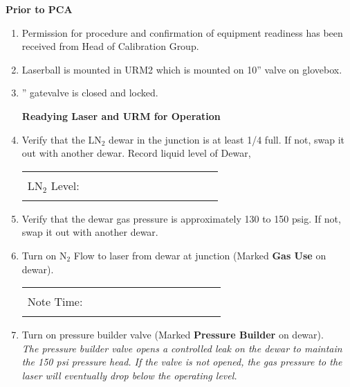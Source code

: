 \begin{center}
                     {\bf Prior to PCA}
\end{center}
\begin{enumerate}
\item\checkbox Permission for procedure and confirmation of equipment readiness
  has been received from Head of Calibration Group.

\item\checkbox Laserball is mounted in URM2 which is
  mounted on 10'' valve on glovebox.

\item{}'' gatevalve is closed and locked.

  

\begin{center}
                  {\bf Readying Laser and URM for Operation}
\end{center}

\item\checkbox Verify that the LN$_2$ dewar in the junction is
  at least 1/4 full.  If not, swap it out with another dewar.
  Record liquid level of Dewar,
     \begin{center}
     \begin{tabular}{|l|}
     \hline
      \\
     LN$_2$ Level:~~~~~~~~~~~~~~~~~~~~~~~~\\
      \\
     \hline
     \end{tabular}
     \end{center}

\item\checkbox Verify that the dewar gas pressure is approximately
  130 to 150 psig. If not, swap it out with another dewar.

\item\checkbox Turn on N$_2$ Flow to laser from dewar at junction 
  (Marked {\bf Gas Use} on dewar).
     \begin{center}
     \begin{tabular}{|l|}
     \hline
      \\
     Note Time:~~~~~~~~~~~~~~~~~~~~~~~~\\
      \\
     \hline
     \end{tabular}
     \end{center}

\item\checkbox Turn on pressure builder valve (Marked {\bf Pressure Builder} 
  on dewar).\\
  \small
  {\em The pressure builder valve opens a controlled leak on the dewar
       to maintain the 150 psi pressure head.  If the valve is not
       opened, the gas pressure to the laser will eventually
       drop below the operating level.}
  \normalsize



\end{enumerate}
